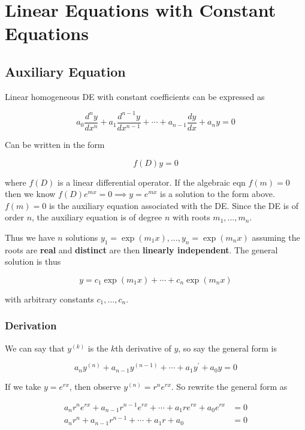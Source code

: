 \section{Linear Equations with Constant Equations}

\subsection{Auxiliary Equation}

Linear homogeneous DE with constant coefficients can be expressed as

\begin{equation}
    a_{0} \frac{d^{n} y}{d x^{n}}+a_{1} \frac{d^{n-1} y}{d x^{n-1}}+\cdots+a_{n-1} \frac{d y}{d x}+a_{n} y=0
\end{equation}

Can be written in the form

\begin{equation}
    f(D)y=0
\end{equation}

where $f(D)$ is a linear differential operator. If the algebraic eqn $f(m)=0$
then we know $f(D)e^{mx}=0\implies y=e^{mx}$ is a solution to the form above.
$f(m)=0$ is the auxiliary equation associated with the DE.
Since the DE is of order $n$, the auxiliary equation is of degree $n$ with
roots $m_1,\ldots,m_n$.

Thus we have $n$ solutions $y_1=\exp(m_1x),\ldots,y_n=\exp(m_nx)$ assuming
the roots are \textbf{real} and \textbf{distinct} are then \textbf{linearly independent}.
The general solution is thus

\begin{equation}
    y=c_1\exp(m_1x)+\cdots+c_n\exp(m_nx)
\end{equation}

with arbitrary constants $c_1,\ldots,c_n$.

\subsubsection{Derivation}

We can say that $y^{(k)}$ is the $k$th derivative of $y$, so say the general form is

$$
a_ny^{(n)}+a_{n-1}y^{(n-1)}+\cdots+a_1y^\prime +a_0y=0
$$

If we take $y=e^{rx}$, then observe $y^{(n)}=r^ne^{rx}$. So rewrite the general form as

\begin{align*}
    a_nr^ne^{rx}+a_{n-1}r^{n-1}e^{rx}+\cdots+a_1re^{rx}+a_0e^{rx}&=0\\
    a_nr^n+a_{n-1}r^{n-1}+\cdots+a_1r+a_0&=0
\end{align*}

